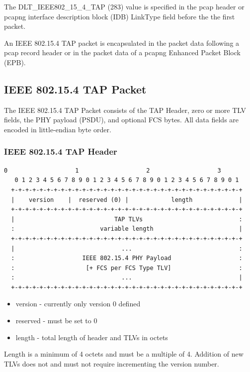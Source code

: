 \documentclass[12pt]{article}
\renewcommand\_{\textunderscore\allowbreak}
\begin{document}
The DLT_IEEE802_15_4_TAP (283) value is specified in the pcap header or pcapng
interface description block (IDB) LinkType field before the the first packet.

An IEEE 802.15.4 TAP packet is encapsulated in the packet data following a
pcap record header or in the packet data of a pcapng Enhanced Packet Block
(EPB).

\subsection{IEEE 802.15.4 TAP Packet}

The IEEE 802.15.4 TAP Packet consists of the TAP Header, zero or more TLV
fields, the PHY payload (PSDU), and optional FCS bytes.  All data fields are
encoded in little-endian byte order.

\subsubsection{IEEE 802.15.4 TAP Header}

\begin{Verbatim}[samepage=true]
   0                   1                   2                   3
   0 1 2 3 4 5 6 7 8 9 0 1 2 3 4 5 6 7 8 9 0 1 2 3 4 5 6 7 8 9 0 1
  +-+-+-+-+-+-+-+-+-+-+-+-+-+-+-+-+-+-+-+-+-+-+-+-+-+-+-+-+-+-+-+-+
  |    version    |  reserved (0) |            length             |
  +-+-+-+-+-+-+-+-+-+-+-+-+-+-+-+-+-+-+-+-+-+-+-+-+-+-+-+-+-+-+-+-+
  |                            TAP TLVs                           :
  :                        variable length                        |
  +-+-+-+-+-+-+-+-+-+-+-+-+-+-+-+-+-+-+-+-+-+-+-+-+-+-+-+-+-+-+-+-+
  |                              ...                              :
  :                   IEEE 802.15.4 PHY Payload                   :
  :                    [+ FCS per FCS Type TLV]                   :
  :                              ...                              |
  +-+-+-+-+-+-+-+-+-+-+-+-+-+-+-+-+-+-+-+-+-+-+-+-+-+-+-+-+-+-+-+-+
\end{Verbatim}

\begin{itemize}
    \item version - currently only version 0 defined
    \item reserved - must be set to 0
    \item length - total length of header and TLVs in octets
\end{itemize}
Length is a minimum of 4 octets and must be a multiple of 4.  Addition of new
TLVs does not and must not require incrementing the version number.
\end{document}
